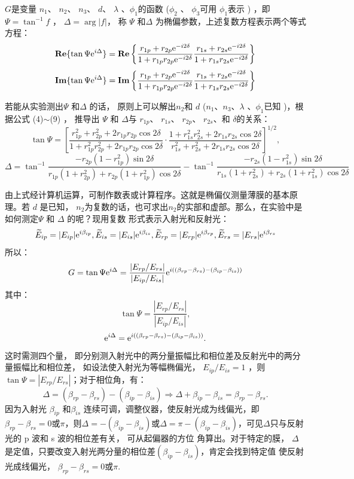 \documentclass[a4paper]{article}
\begin{document}
$G$是变量 $n_1$、 $n_2$、 $n_3$、 $d$、 $\lambda$ 、$\phi_1$的函数 ($\phi_2$ 、 $\phi_3$可用 $\phi_1$表示 ) ，即$\Psi=\tan^{-1}f$ ， $\Delta=\arg|f|$， 称 $\Psi$ 和$\Delta$ 为椭偏参数，上述复数方程表示两个等式方程：
$$\textbf{Re}\{\tan\Psi{\rm e}^{i\Delta}\}=\textbf{Re}\left\{\frac{r_{1p}+r_{2p}{\rm e}^{-i2\delta}}{1+r_{1p}r_{2p}{\rm e}^{-i2\delta}} \frac{r_{1s}+r_{2s}{\rm e}^{-i2\delta}}{1+r_{1s}r_{2s}{\rm e}^{-i2\delta}}\right\}$$
$$\textbf{Im}\{\tan\Psi{\rm e}^{i\Delta}\}=\textbf{Im}\left\{\frac{r_{1p}+r_{2p}{\rm e}^{-i2\delta}}{1+r_{1p}r_{2p}{\rm e}^{-i2\delta}} \frac{r_{1s}+r_{2s}{\rm e}^{-i2\delta}}{1+r_{1s}r_{2s}{\rm e}^{-i2\delta}}\right\}$$

若能从实验测出$\Psi$ 和$\Delta$ 的话， 原则上可以解出$n_2$和 $d$ ($n_1$、$n_3$、$\lambda$ 、$\phi_1$已知 )，根据公式 (4)$\sim$(9) ， 推导出 $\Psi$ 和 $\Delta$与 $r_{1p}$、 $r_{1s}$、 $r_{2p}$、 $r_{2s}$、和 $\delta$的关系：
$$\tan\Psi=\left[\frac{r_{1p}^2+r_{2p}^2+2r_{1p}r_{2p}\cos2\delta}{1+r_{1p}^2r_{2p}^2+2r_{1p}r_{2p}\cos2\delta} \cdot \frac{1+r_{1s}^2r_{2s}^2+2r_{1s}r_{2s}\cos2\delta}{r_{1s}^2+r_{2s}^2+2r_{1s}r_{2s}\cos2\delta}\right]^{1/2},$$
$$\Delta=\tan^{-1}\frac{-r_{2p}(1-r_{1p}^2)\sin2\delta}{r_{1p}(1+r_{2p}^2)+r_{2p}(1+r_{1p}^2)\cos2\delta} - \tan^{-1}\frac{-r_{2s}(1-r_{1s}^2)\sin2\delta}{r_{1s}(1+r_{2s}^2)+r_{2s}(1+r_{1s}^2)\cos2\delta}$$

由上式经计算机运算，可制作数表或计算程序。这就是椭偏仪测量薄膜的基本原理。若	$d$ 是已知， $n_2$为复数的话，也可求出$n_2$的实部和虚部。那么，在实验中是如何测定$\Psi$ 和 $\Delta$ 的呢？现用复数 形式表示入射光和反射光：
$$\widetilde{E}_{ip}=|E_{ip}|{\rm e}^{i\beta_{ip}},\widetilde{E}_{is}=|E_{is}|{\rm e}^{i\beta_{is}},\widetilde{E}_{rp}=|E_{rp}|{\rm e}^{i\beta_{rp}},\widetilde{E}_{rs}=|E_{rs}|{\rm e}^{i\beta_{rs}}$$
所以：
$$G=\tan\Psi{\rm e}^{i\Delta}=\frac{|E_{rp}/E_{rs}|}{|E_{ip}/E_{is}|}{\rm e}^{i((\beta_{rp}-\beta_{rs})-(\beta_{ip}-\beta_{is}))}$$
其中：
$$\tan\Psi=\frac{|E_{rp}/E_{rs}|}{|E_{ip}/E_{is}|},$$
$${\rm e}^{i\Delta}={\rm e}^{i((\beta_{rp}-\beta_{rs})-(\beta_{ip}-\beta_{is}))}.$$
这时需测四个量， 即分别测入射光中的两分量振幅比和相位差及反射光中的两分量振幅比和相位差， 如设法使入射光为等幅椭偏光，	$E_{ip}/E_{is} = 1$ ，则 $\tan\Psi=|E_{rp}/E_{rs}|$；对于相位角，有：
$$\Delta=(\beta_{rp}-\beta_{rs})-(\beta_{ip}-\beta_{is})\Rightarrow\Delta+\beta_{ip}-\beta_{is}=\beta_{rp}-\beta_{rs}.$$
因为入射光 $\beta_{ip}$ 和$\beta_{is}$ 连续可调，调整仪器，使反射光成为线偏光，即	$\beta_{rp}-\beta_{rs}=0\text{或}\pi$，则$\Delta=-(\beta_{ip}- \beta_{is})$或$\Delta=\pi-(\beta_{ip}-\beta_{is})$，可见$\Delta$只与反射光的 p 波和 s 波的相位差有关， 可从起偏器的方位 角算出。对于特定的膜， $\Delta$ 是定值，只要改变入射光两分量的相位差$ (\beta_{ip}- \beta_{is})$，肯定会找到特定值 使反射光成线偏光， $\beta_{rp}-\beta_{rs}=0\text{或}\pi$.
\end{document}

